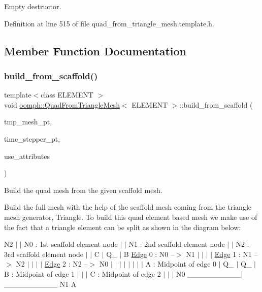 Empty destructor. 



Definition at line 515 of file quad\+\_\+from\+\_\+triangle\+\_\+mesh.\+template.\+h.



\subsection{Member Function Documentation}
\mbox{\label{classoomph_1_1QuadFromTriangleMesh_ae4146d9e92cce365c292f92fcdc88c47}} 
\subsubsection{\texorpdfstring{build\+\_\+from\+\_\+scaffold()}{build\_from\_scaffold()}}
{\footnotesize\ttfamily template$<$class E\+L\+E\+M\+E\+NT $>$ \\
void \hyperlink{classoomph_1_1QuadFromTriangleMesh}{oomph\+::\+Quad\+From\+Triangle\+Mesh}$<$ E\+L\+E\+M\+E\+NT $>$\+::build\+\_\+from\+\_\+scaffold (\begin{DoxyParamCaption}\item[{\hyperlink{classoomph_1_1TriangleScaffoldMesh}{Triangle\+Scaffold\+Mesh} $\ast$}]{tmp\+\_\+mesh\+\_\+pt,  }\item[{\hyperlink{classoomph_1_1TimeStepper}{Time\+Stepper} $\ast$}]{time\+\_\+stepper\+\_\+pt,  }\item[{const bool \&}]{use\+\_\+attributes }\end{DoxyParamCaption})}



Build the quad mesh from the given scaffold mesh. 

Build the full mesh with the help of the scaffold mesh coming from the triangle mesh generator, Triangle. To build this quad element based mesh we make use of the fact that a triangle element can be split as shown in the diagram below\+:

N2 $\vert$ $\vert$ N0 \+: 1st scaffold element node $\vert$ $\vert$ N1 \+: 2nd scaffold element node $\vert$ $\vert$ N2 \+: 3rd scaffold element node $\vert$ $\vert$ C $\vert$ Q\+\_ $\vert$ B \hyperlink{classoomph_1_1Edge}{Edge} 0 \+: N0 --$>$ N1 $\vert$ $\vert$ $\vert$ $\vert$ \hyperlink{classoomph_1_1Edge}{Edge} 1 \+: N1 --$>$ N2 $\vert$ $\vert$ $\vert$ $\vert$ \hyperlink{classoomph_1_1Edge}{Edge} 2 \+: N2 --$>$ N0 $\vert$ $\vert$ $\vert$ $\vert$ $\vert$ $\vert$ $\vert$ $\vert$ A \+: Midpoint of edge 0 $\vert$ Q\+\_ $\vert$ Q\+\_ $\vert$ B \+: Midpoint of edge 1 $\vert$ $\vert$ $\vert$ C \+: Midpoint of edge 2 $\vert$ $\vert$ $\vert$ N0 \+\_\+\+\_\+\+\_\+\+\_\+\+\_\+\+\_\+\+\_\+\+\_\+\+\_\+\+\_\+$\vert$\+\_\+\+\_\+\+\_\+\+\_\+\+\_\+\+\_\+\+\_\+\+\_\+\+\_\+\+\_\+ N1 A

